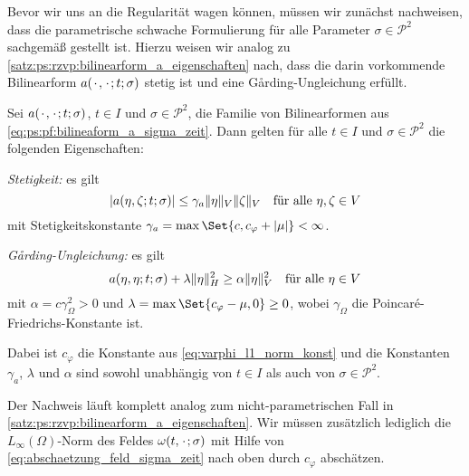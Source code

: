 Bevor wir uns an die Regularität wagen können, müssen wir zunächst nachweisen, dass die parametrische schwache Formulierung für alle Parameter $\sigma \in \mathcal P^{2}$ sachgemäß gestellt ist.
Hierzu weisen wir analog zu \cref{satz:ps:rzvp:bilinearform_a_eigenschaften} nach, dass die darin vorkommende Bilinearform $a({\mkern2mu\cdot\mkern2mu}, {\mkern2mu\cdot\mkern2mu}; t; \sigma)$ stetig ist und eine G\aa{}rding-Ungleichung erfüllt.

\begin{Satz}
\label{satz:bf_a_param_stetig_garding}
    Sei $a({\mkern2mu\cdot\mkern2mu}, {\mkern2mu\cdot\mkern2mu}; t; \sigma)$, $t \in I$ und $\sigma \in \mathcal P^{2}$, die Familie von Bilinearformen aus \cref{eq:ps:pf:bilineaform_a_sigma_zeit}.
    Dann gelten für alle $t \in I$ und $\sigma \in \mathcal P^{2}$ die folgenden Eigenschaften:
    \begin{thmenumerate}
        \item\label{satz:ps:rzvp:bilinearform_a_eigenschaften_stetig}
        \emph{Stetigkeit:} es gilt
        \begin{equation}
            \label{eq:ps:rzvp:bilinearform_a_eigenschaften_stetig}
            \lvert a(\eta, \zeta; t; \sigma)\rvert \leq \gamma_{a} \lVert\eta\rVert_{V} \lVert\zeta\rVert_{V} \quad \text{für alle}~\eta, \zeta \in V
        \end{equation}
        mit Stetigkeitskonstante $\gamma_{a} = \max\Set{c, c_{\varphi} + \abs{\mu}} < \infty$.
        \item\label{satz:ps:rzvp:bilinearform_a_eigenschaften_garding}
        \emph{G\aa{}rding-Ungleichung:} es gilt
        \begin{equation}
            \label{eq:ps:rzvp:bilinearform_a_eigenschaften_garding}
            a(\eta, \eta; t; \sigma) + \lambda \lVert\eta\rVert_{H}^{2} \geq \alpha \lVert\eta\rVert_{V}^{2} \quad \text{für alle}~\eta \in V
        \end{equation}
        mit $\alpha = c \gamma_{\Omega}^{2} > 0$ und $\lambda = \max\Set{c_{\varphi} - \mu, 0} \geq 0$, wobei $\gamma_{\Omega}$ die Poincaré-Friedrichs-Konstante ist.
    \end{thmenumerate}
    Dabei ist $c_{\varphi}$ die Konstante aus \cref{eq:varphi_l1_norm_konst} und die Konstanten $\gamma_{a}$, $\lambda$ und $\alpha$ sind sowohl unabhängig von $t \in I$ als auch von $\sigma \in \mathcal P^{2}$.

    \begin{Beweis}
        Der Nachweis läuft komplett analog zum nicht-parametrischen Fall in \cref{satz:ps:rzvp:bilinearform_a_eigenschaften}.
        Wir müssen zusätzlich lediglich die $L_{\infty}(\Omega)$-Norm des Feldes $\omega(t, {\mkern2mu\cdot\mkern2mu}; \sigma)$ mit Hilfe von \cref{eq:abschaetzung_feld_sigma_zeit} nach oben durch $c_{\varphi}$ abschätzen.
    \end{Beweis}
\end{Satz}

